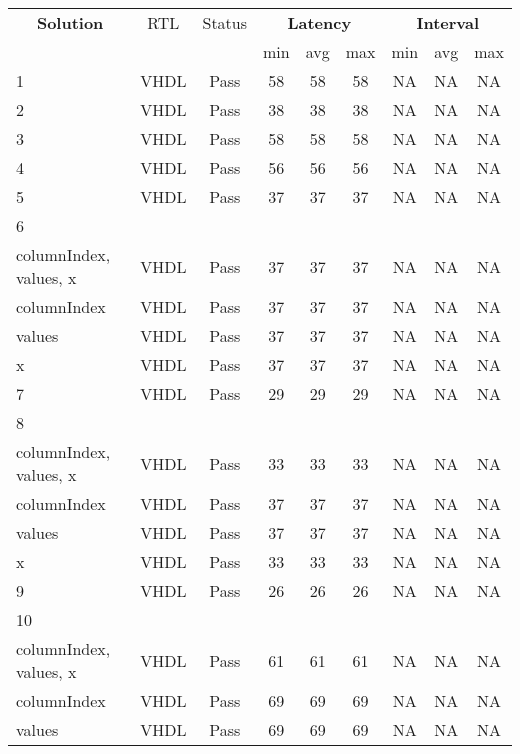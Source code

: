 \begin{table}[H]
	\centering
	\begin{tabular}{|l|c|c|c|c|c|c|c|c|}
		\hline
		\multicolumn{1}{|c|}{\textbf{Solution}} & \multicolumn{1}{|c|}{RTL} & \multicolumn{1}{|c|}{Status} & \multicolumn{3}{c|}{\textbf{Latency}} & \multicolumn{3}{c|}{\textbf{Interval}} \\
		& &  & min & avg & max & min & avg & max \\
		\hline
		1 & VHDL & Pass & 58 & 58 & 58 & NA & NA & NA \\
		\hline
		2 & VHDL & Pass & 38 & 38 & 38 & NA & NA & NA \\
		\hline
		3 & VHDL & Pass & 58 & 58 & 58 & NA & NA & NA \\
		\hline
		4 & VHDL & Pass & 56 & 56 & 56 & NA & NA & NA \\
		\hline
		5 & VHDL & Pass & 37 & 37 & 37 & NA & NA & NA \\
		\hline
		6 &  &  &  &  &  &  &  &  \\
		\tabitem columnIndex, values, x & VHDL & Pass & 37 & 37 & 37 & NA & NA & NA \\
		\tabitem columnIndex & VHDL & Pass & 37 & 37 & 37 & NA & NA & NA \\
		\tabitem values & VHDL & Pass & 37 & 37 & 37 & NA & NA & NA \\
		\tabitem x & VHDL & Pass & 37 & 37 & 37 & NA & NA & NA \\
		\hline
		7 & VHDL & Pass & 29 & 29 & 29 & NA & NA & NA \\
		\hline
		8 &  &  &  &  &  &  &  &  \\
		\tabitem columnIndex, values, x & VHDL & Pass & 33 & 33 & 33 & NA & NA & NA \\
		\tabitem columnIndex & VHDL & Pass & 37 & 37 & 37 & NA & NA & NA \\
		\tabitem values & VHDL & Pass & 37 & 37 & 37 & NA & NA & NA \\
		\tabitem x & VHDL & Pass & 33 & 33 & 33 & NA & NA & NA \\
		\hline
		9 & VHDL & Pass & 26 & 26 & 26 & NA & NA & NA \\
		\hline
		10 &  &  &  &  &  &  &  &  \\
		\tabitem columnIndex, values, x & VHDL & Pass & 61 & 61 & 61 & NA & NA & NA \\
		\tabitem columnIndex & VHDL & Pass & 69 & 69 & 69 & NA & NA & NA \\
		\tabitem values & VHDL & Pass & 69 & 69 & 69 & NA & NA & NA \\

\end{tabular}
\end{table}
